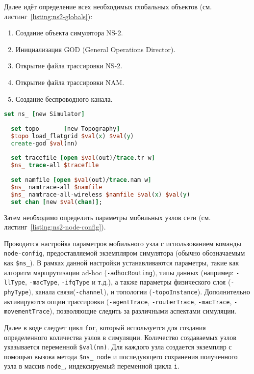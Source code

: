   Далее идёт определение всех необходимых глобальных объектов (см. листинг~\ref{listing:ns2-globals}):
  
\begin{enumerate}
    \item Создание объекта симулятора NS-2.
    \item Инициализация GOD (General Operations Director).
    \item Открытие файла трассировки NS-2.
    \item Открытие файла трассировки NAM.
    \item Создание беспроводного канала.
\end{enumerate}

\newpage
  
\begin{lstlisting}[language=tcl, style=mystyle, caption=Определение глобальных объектов в NS-2, label=listing:ns2-globals]
  set ns_ [new Simulator]
  
  set topo       [new Topography]
  $topo load_flatgrid $val(x) $val(y)
  create-god $val(nn)
  
  set tracefile [open $val(out)/trace.tr w]
  $ns_ trace-all $tracefile
  
  set namfile [open $val(out)/trace.nam w]
  $ns_ namtrace-all $namfile
  $ns_ namtrace-all-wireless $namfile $val(x) $val(y)
  set chan [new $val(chan)];
\end{lstlisting}

Затем необходимо определить параметры мобильных узлов сети (см. листинг~\ref{listing:ns2-node-config}).

Проводится настройка параметров мобильного узла с использованием команды \verb|node-config|, предоставляемой экземпляром симулятора (обычно обозначаемым как \verb|$ns_|). В рамках данной настройки устанавливаются параметры, такие как алгоритм маршрутизации ad-hoc (\verb|-adhocRouting|), типы данных (например: \verb|-llType|, \verb|-macType|, \verb|-ifqType| и т.д.), а также параметры физического слоя (\verb|-phyType|), канала связи\linebreak (\verb|-channel|), и топологии (\verb|-topoInstance|). Дополнительно активируются опции трассировки (\verb|-agentTrace|, \verb|-routerTrace|, \verb|-macTrace|, \verb|-movementTrace|), позволяющие следить за различными аспектами симуляции.

Далее в коде следует цикл \verb|for|, который используется для создания определенного количества узлов в симуляции. Количество создаваемых узлов указывается переменной \verb|$val(nn)|. Для каждого узла создается экземпляр с помощью вызова метода \verb|$ns_ node| и последующего сохранения полученного узла в массив \verb|node_|, индексируемый переменной цикла \verb|i|.

